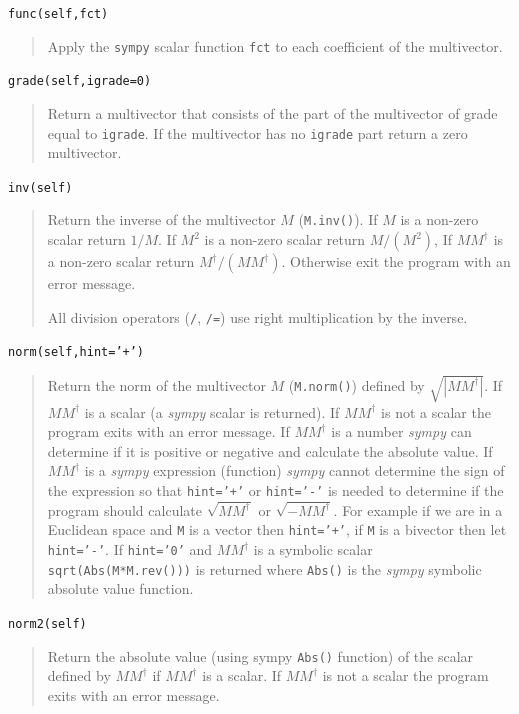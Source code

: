 \documentclass[12pt]{report}
\newcommand{\lp}{\left (}
\newcommand{\rp}{\right )}
\newcommand{\abs}[1]{\left |{#1}\right |}
\newcommand{\R}{\dagger}
\newcommand{\paren}[1]{\lp {#1} \rp}
\newcommand{\T}[1]{\texttt{#1}}
\begin{document}
\T{func(self,fct)}
\begin{quote}
   Apply the \T{sympy} scalar function \T{fct} to each coefficient of the multivector.
\end{quote}

\T{grade(self,igrade=0)}
\begin{quote}
    Return a multivector that consists of the part of the multivector of
    grade equal to \T{igrade}.  If the multivector has no \T{igrade} part
    return a zero multivector.
\end{quote}

\T{inv(self)}
\begin{quote}
   Return the inverse of the multivector $M$ (\T{M.inv()}). If $M$ is a non-zero scalar return $1/M$.  If $M^{2}$ is a non-zero
   scalar return $M/\paren{M^{2}}$, If $MM^{\R}$ is a non-zero scalar return $M^{\R}/\paren{MM^{\R}}$.  Otherwise exit the program with
   an error message.
   
   All division operators (\T{/}, \T{/=}) use right multiplication by the inverse.
\end{quote}

\T{norm(self,hint='+')}
\begin{quote}
   Return the norm of the multivector $M$ (\T{M.norm()}) defined by $\sqrt{\abs{MM^{\R}}}$.  If $MM^{\R}$ is a scalar (a \emph{sympy} scalar
   is returned).  If $MM^{\R}$ is not a scalar the program exits with an error message. If $MM^{\R}$ is a number \emph{sympy} can determine
   if it is positive or negative and calculate the absolute value.  If $MM^{\R}$ is a \emph{sympy} expression (function) \emph{sympy} cannot
   determine the sign of the expression so that \T{hint='+'} or \T{hint='-'} is needed to determine if the program should calculate
   $\sqrt{MM^{\R}}$ or $\sqrt{-MM^{\R}}$. For example if we are in a Euclidean space and \T{M} is a vector then \T{hint='+'}, if
   \T{M} is a bivector then let \T{hint='-'}. If \T{hint='0'} and $MM^{\R}$ is a symbolic scalar \T{sqrt(Abs(M*M.rev()))} is returned 
   where \T{Abs()} is the \emph{sympy} symbolic absolute value function.
\end{quote}

\T{norm2(self)}
\begin{quote}
   Return the absolute value (using sympy \T{Abs()} function) of the scalar defined by $MM^{\R}$ if $MM^{\R}$ is a scalar.  If 
   $MM^{\R}$ is not a scalar the program exits with an error message.
\end{quote}
\end{document}
